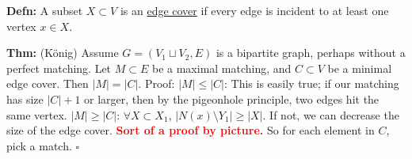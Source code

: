 \documentclass[10pt,letterpaper]{article}
\newcommand{\n}{\hfill\break}
\newcommand{\defn}[1]{\par\noindent\settowidth{\hangindent}{\textbf{Defn: }}\textbf{Defn: }#1\n}
\newcommand{\thm}[1]{\par\noindent\settowidth{\hangindent}{\textbf{Thm: }}\textbf{Thm: }#1\n}
\newcommand{\proven}{\;$\square$\n}
\newcommand{\card}[1]{\left|#1\right|}
\newcommand{\flag}[1]{\textbf{\textcolor{red}{#1}}}
\begin{document}
\defn{A subset $X\subset{}V$ is an \underline{edge cover} if every edge is incident to at least one vertex $x\in{}X$.}

\thm{(K\"onig) Assume $G=(V_{1}\sqcup{}V_{2},E)$ is a bipartite graph, perhaps without a perfect matching. Let $M\subset{}E$ be a maximal matching, and $C\subset{}V$ be a minimal edge cover. Then $\card{M}=\card{C}$.\n
Proof:\n
$\card{M}\le\card{C}$: This is easily true; if our matching has size $\card{C}+1$ or larger, then by the pigeonhole principle, two edges hit the same vertex.\n
$\card{M}\ge\card{C}$: $\forall{}X\subset{}X_{1}$, $\card{N(x)\setminus{}Y_{1}}\ge\card{X}$. If not, we can decrease the size of the edge cover. \flag{Sort of a proof by picture.} So for each element in $C$, pick a match.\n
\proven}
\end{document}
